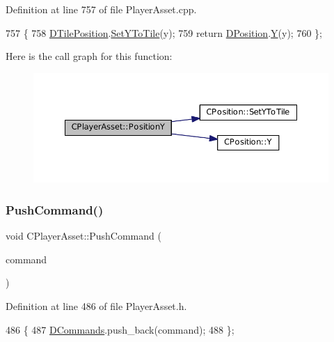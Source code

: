 Definition at line 757 of file Player\+Asset.\+cpp.


\begin{DoxyCode}
757                                 \{
758     \hyperlink{classCPlayerAsset_a5b59a9d3b7db8c7fa194b80dafb96186}{DTilePosition}.\hyperlink{classCPosition_a5805485f623398197ac595a5d389f691}{SetYToTile}(y);
759     \textcolor{keywordflow}{return} \hyperlink{classCPlayerAsset_aa9f53c009b181c7c5647c6b03776a04c}{DPosition}.\hyperlink{classCPosition_a1aa8a30e2f08dda1f797736ba8c13a87}{Y}(y);
760 \};
\end{DoxyCode}
Here is the call graph for this function\+:
\nopagebreak
\begin{figure}[H]
\begin{center}
\leavevmode
\includegraphics[width=350pt]{classCPlayerAsset_a497fe719ca97252f0ee7985e0e30518e_cgraph}
\end{center}
\end{figure}
\hypertarget{classCPlayerAsset_ab7421ec7906d36f028484ff518cc3c90}{}\label{classCPlayerAsset_ab7421ec7906d36f028484ff518cc3c90} 
\subsubsection{\texorpdfstring{Push\+Command()}{PushCommand()}}
{\footnotesize\ttfamily void C\+Player\+Asset\+::\+Push\+Command (\begin{DoxyParamCaption}\item[{const \hyperlink{structSAssetCommand}{S\+Asset\+Command} \&}]{command }\end{DoxyParamCaption})\hspace{0.3cm}{\ttfamily [inline]}}



Definition at line 486 of file Player\+Asset.\+h.


\begin{DoxyCode}
486                                                       \{
487             \hyperlink{classCPlayerAsset_a4d3b96106d3b1c1020f98005884d2a87}{DCommands}.push\_back(command);
488         \};
\end{DoxyCode}
\hypertarget{classCPlayerAsset_a717695212dd7159bd0b6e97d4ae5cf9b}{}\label{classCPlayerAsset_a717695212dd7159bd0b6e97d4ae5cf9b} 
